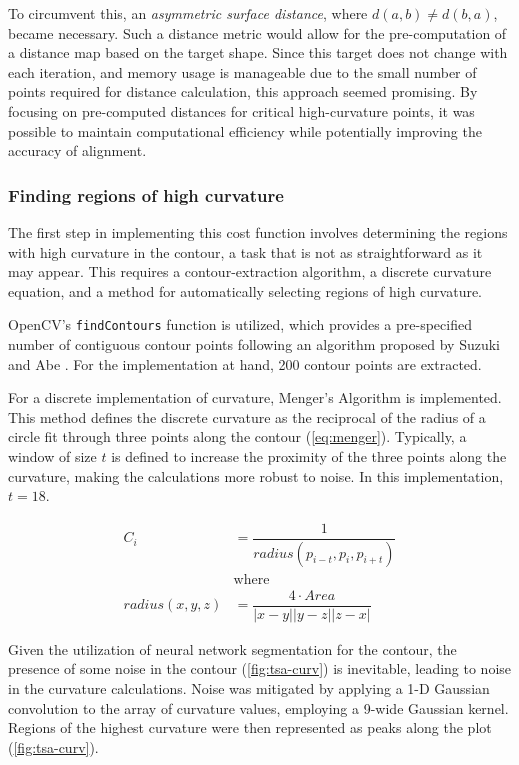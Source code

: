 To circumvent this, an \emph{asymmetric surface distance}, where $d(a,b) \ne d(b,a)$, became necessary.
Such a distance metric would allow for the pre-computation of a distance map based on the target shape.
Since this target does not change with each iteration, and memory usage is manageable due to the small number of points required for distance calculation, this approach seemed promising.
By focusing on pre-computed distances for critical high-curvature points, it was possible to maintain computational efficiency while potentially improving the accuracy of alignment.


\subsubsection{Finding regions of high curvature}
The first step in implementing this cost function involves determining the regions with high curvature in the contour, a task that is not as straightforward as it may appear.
This requires a contour-extraction algorithm, a discrete curvature equation, and a method for automatically selecting regions of high curvature.

OpenCV's \texttt{findContours} function \cite{bradskiOpenCVLibrary2000} is utilized, which provides a pre-specified number of contiguous contour points following an algorithm proposed by Suzuki and Abe \cite{suzukiTopologicalStructuralAnalysis1985}.
For the implementation at hand, 200 contour points are extracted.


For a discrete implementation of curvature, Menger's Algorithm \cite{legerMengerCurvatureRectifiability1999} is implemented.
This method defines the discrete curvature as the reciprocal of the radius of a circle fit through three points along the contour (\cref{eq:menger}).
Typically, a window of size $t$ is defined to increase the proximity of the three points along the curvature, making the calculations more robust to noise.
In this implementation, $t=18$.


\begin{equation}
  \label{eq:menger}
  \begin{split}
  C_{i} &= \dfrac{1}{radius(p_{i-t},p_{i},p_{i+t})}\\
        &\text{where} \\
        radius(x,y,z) &= \dfrac{4 \cdot Area}{|x-y||y-z||z-x|}
  \end{split}
\end{equation}

Given the utilization of neural network segmentation for the contour, the presence of some noise in the contour (\cref{fig:tsa-curv}) is inevitable, leading to noise in the curvature calculations.
Noise was mitigated by applying a 1-D Gaussian convolution to the array of curvature values, employing a 9-wide Gaussian kernel.
Regions of the highest curvature were then represented as peaks along the plot (\cref{fig:tsa-curv}).

